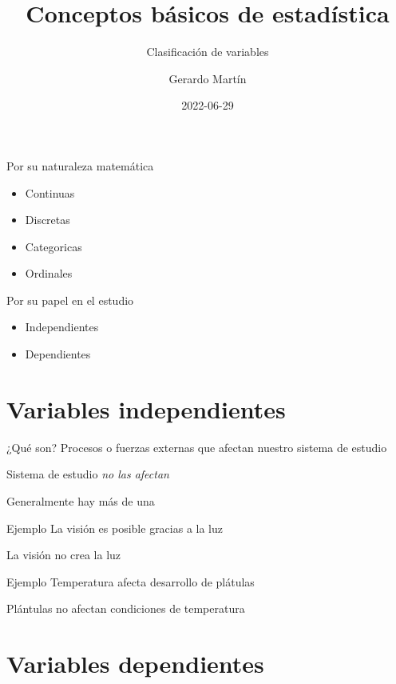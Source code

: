 \documentclass[
  11pt,
  ignorenonframetext,
]{beamer}
\title{Conceptos básicos de estadística}
\subtitle{Clasificación de variables}
\author{Gerardo Martín}
\date{2022-06-29}
\begin{document}
\frame{\titlepage}

\begin{frame}{Por su naturaleza matemática}
\protect\hypertarget{por-su-naturaleza-matemuxe1tica}{}
\begin{itemize}
\item
  Continuas
\item
  Discretas
\item
  Categoricas
\item
  Ordinales
\end{itemize}
\end{frame}

\begin{frame}{Por su papel en el estudio}
\protect\hypertarget{por-su-papel-en-el-estudio}{}
\begin{itemize}
\item
  Independientes
\item
  Dependientes
\end{itemize}
\end{frame}

\hypertarget{variables-independientes}{%
\section{Variables independientes}\label{variables-independientes}}

\begin{frame}{¿Qué son?}
\protect\hypertarget{quuxe9-son}{}
Procesos o fuerzas externas que afectan nuestro sistema de estudio

Sistema de estudio \emph{no las afectan}

Generalmente hay más de una
\end{frame}

\begin{frame}{Ejemplo}
\protect\hypertarget{ejemplo}{}
La visión es posible gracias a la luz

La visión no crea la luz
\end{frame}

\begin{frame}{Ejemplo}
\protect\hypertarget{ejemplo-1}{}
Temperatura afecta desarrollo de plátulas

Plántulas no afectan condiciones de temperatura
\end{frame}

\hypertarget{variables-dependientes}{%
\section{Variables dependientes}\label{variables-dependientes}}
\end{document}

